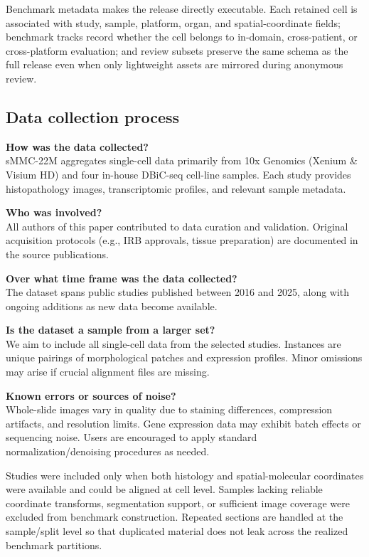 \documentclass{article}
\newcommand{\dataset}{sMMC-22M\xspace}
\begin{document}
Benchmark metadata makes the release directly executable. Each retained cell is associated with study, sample, platform, organ, and spatial-coordinate fields; benchmark tracks record whether the cell belongs to in-domain, cross-patient, or cross-platform evaluation; and review subsets preserve the same schema as the full release even when only lightweight assets are mirrored during anonymous review.


\subsection{Data collection process}
\noindent
\textbf{How was the data collected?} \\
\dataset aggregates single-cell data primarily from 10x Genomics (Xenium \& Visium HD) and four in-house DBiC-seq cell-line samples. Each study provides histopathology images, transcriptomic profiles, and relevant sample metadata.

\noindent
\textbf{Who was involved?} \\
All authors of this paper contributed to data curation and validation. Original acquisition protocols (e.g., IRB approvals, tissue preparation) are documented in the source publications.

\noindent
\textbf{Over what time frame was the data collected?} \\
The dataset spans public studies published between 2016 and 2025, along with ongoing additions as new data become available.

\noindent
\textbf{Is the dataset a sample from a larger set?} \\
We aim to include all single-cell data from the selected studies. Instances are unique pairings of morphological patches and expression profiles. Minor omissions may arise if crucial alignment files are missing.

\noindent
\textbf{Known errors or sources of noise?} \\
Whole-slide images vary in quality due to staining differences, compression artifacts, and resolution limits. Gene expression data may exhibit batch effects or sequencing noise. Users are encouraged to apply standard normalization/denoising procedures as needed.

Studies were included only when both histology and spatial-molecular coordinates were available and could be aligned at cell level. Samples lacking reliable coordinate transforms, segmentation support, or sufficient image coverage were excluded from benchmark construction. Repeated sections are handled at the sample/split level so that duplicated material does not leak across the realized benchmark partitions.
\end{document}

